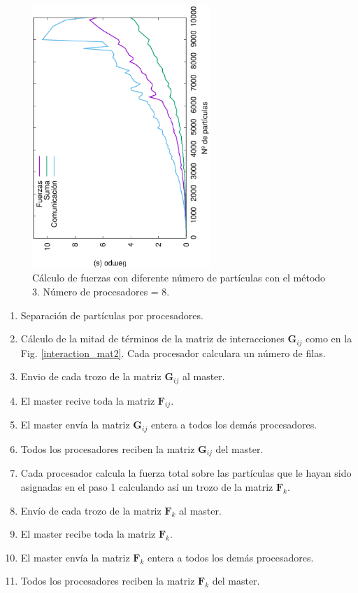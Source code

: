 \documentclass[onecolumn]{article}
\renewcommand{\vec}[1]{\mathbf{#1}}
\begin{document}
\begin{figure}[h]
\begin{center}
\includegraphics[width=0.6\textwidth, angle=-90]{forces_part2.eps}
\caption{Cálculo de fuerzas con diferente número de partículas con el método 3. Número de procesadores = 8.}
\label{xabi_4}
\end{center}
\end{figure}


\begin{enumerate}
    \item Separación de partículas por procesadores.
    \item Cálculo de la mitad de términos de la matriz de interacciones $\vec{G}_{ij}$ como en la Fig. \ref{interaction_mat2}. Cada procesador calculara un número de filas.
    \item Envio de cada trozo de la matriz $\vec{G}_{ij}$ al master.
    \item El master recive toda la matriz $\vec{F}_{ij}$.
    \item El master envía la matriz $\vec{G}_{ij}$ entera a todos los demás procesadores.
    \item Todos los procesadores reciben la matriz $\vec{G}_{ij}$ del master.
    \item Cada procesador calcula la fuerza total sobre las partículas que le hayan sido asignadas en el paso 1 calculando así un trozo de la matriz $\vec{F}_{k}$.
    \item Envío de cada trozo de la matriz $\vec{F}_{k}$ al master.
    \item El master recibe toda la matriz $\vec{F}_{k}$.
    \item El master envía la matriz $\vec{F}_{k}$ entera a todos los demás procesadores.
    \item Todos los procesadores reciben la matriz $\vec{F}_{k}$ del master.
\end{enumerate}
\end{document}
